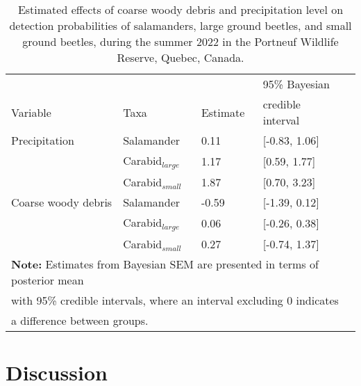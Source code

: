 \begin{table}[ht]
  \centering
  \caption[Estimated effects of coarse woody debris and precipitation level on detection probabilities of salamanders, large ground beetles, and small ground beetles.]
  {Estimated effects of coarse woody debris and precipitation level on detection probabilities of salamanders, large ground beetles, and small ground beetles, during the summer 2022 in the Portneuf Wildlife Reserve,  Quebec, Canada.}
  \label{tab:detection}
  \begin{tabular}{lllll} 
      \hline
      &&&95\% Bayesian \\
      Variable & Taxa & Estimate &  credible interval \\ [0.5ex] 
      \hline      
      Precipitation       & Salamander              & \hspace{1mm}0.11 & [-0.83, 1.06] \\ 
                          & Carabid$_{large}$  & \hspace{1mm}1.17 & [0.59, 1.77] \\ 
                          & Carabid$_{small}$        & \hspace{1mm}1.87 & [0.70, 3.23] \\  
      \hline      
      Coarse woody debris & Salamander              & -0.59 & [-1.39, 0.12] \\ 
                          & Carabid$_{large}$  & \hspace{1mm}0.06 & [-0.26, 0.38] \\ 
                          & Carabid$_{small}$        & \hspace{1mm}0.27 & [-0.74, 1.37] \\   

      \hline
      \multicolumn{4}{l}{\textbf{Note:} Estimates from Bayesian SEM are presented in terms of posterior mean} \\
      \multicolumn{4}{l}{with 95\% credible intervals, where an interval excluding 0 indicates} \\
      \multicolumn{4}{l}{a difference between groups.} \\
  \end{tabular}
\end{table}

\clearpage

\section*{Discussion}
\label{sec:discu1}

